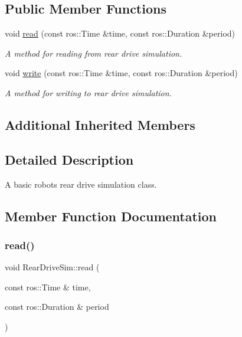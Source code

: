 \subsection*{Public Member Functions}
\begin{DoxyCompactItemize}
\item 
void \hyperlink{classRearDriveSim_a663d8885fa61436bdd1112b14f2c5a31}{read} (const ros\+::\+Time \&time, const ros\+::\+Duration \&period)
\begin{DoxyCompactList}\small\item\em A method for reading from rear drive simulation. \end{DoxyCompactList}\item 
void \hyperlink{classRearDriveSim_a814f528a26c9dcf0b0d3490883abb2d2}{write} (const ros\+::\+Time \&time, const ros\+::\+Duration \&period)
\begin{DoxyCompactList}\small\item\em A method for writing to rear drive simulation. \end{DoxyCompactList}\end{DoxyCompactItemize}
\subsection*{Additional Inherited Members}


\subsection{Detailed Description}
A basic robot\textquotesingle{}s rear drive simulation class. 

\subsection{Member Function Documentation}
\mbox{\label{classRearDriveSim_a663d8885fa61436bdd1112b14f2c5a31}} 
\subsubsection{\texorpdfstring{read()}{read()}}
{\footnotesize\ttfamily void Rear\+Drive\+Sim\+::read (\begin{DoxyParamCaption}\item[{const ros\+::\+Time \&}]{time,  }\item[{const ros\+::\+Duration \&}]{period }\end{DoxyParamCaption})\hspace{0.3cm}{\ttfamily [virtual]}}



